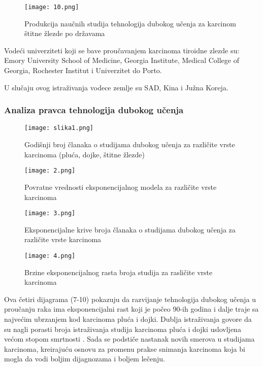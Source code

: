 \documentclass[a4paper]{article}
\begin{document}
\begin{figure}[hbt!]
\centering
\texttt{[image: 10.png]}
\caption{Produkcija naučnih studija tehnologija dubokog učenja za karcinom štitne žlezde po državama}
\end{figure}

Vodeći univerziteti koji se bave proučavanjem karcinoma tiroidne zlezde su: Emory University School of Medicine, Georgia Institute, Medical College of Georgia, Rochester Institut i Univerzitet do Porto.

U slučaju ovog istraživanja vodece zemlje su SAD, Kina i Južna Koreja.


\FloatBarrier

\subsubsection{Analiza pravca tehnologija dubokog učenja}
\label{subsec:ppnaslov1}

\begin{figure}[hbt!]
\centering
\texttt{[image: slika1.png]}
\caption{Godišnji broj članaka o studijama dubokog učenja za različite vrste karcinoma (pluća, dojke, štitne žlezde)}
\end{figure}

\begin{figure}[hbt!]
\centering
\texttt{[image: 2.png]}
\caption{Povratne vrednosti eksponencijalnog modela za različite vrste karcinoma}
\end{figure}



\begin{figure}[hbt!]
\centering
\texttt{[image: 3.png]}
\caption{Eksponencijalne krive broja članaka o studijama dubokog učenja za različite vrste karcinoma}
\end{figure}

\begin{figure}[hbt!]
\centering
\texttt{[image: 4.png]}
\caption{Brzine eksponencijalnog rasta broja studija za rasličite vrste karcinoma}
\end{figure}

\newline
Ova četiri dijagrama (7-10) pokazuju da razvijanje tehnologija dubokog učenja u proučanju raka ima eksponencijalni rast koji je počeo 90-ih godina i dalje traje sa najvećim ubrzanjem kod karcinoma pluća i dojki. Dublja istraživanja govore da su nagli porasti broja istraživanja studija karcinoma pluća i dojki uslovljena većom stopom smrtnosti \cite{coccia2}. Sada se podstiče nastanak novih smerova u studijama karcinoma, kreirajuću osnovu za promenu prakse snimanja karcinoma koja bi mogla da vodi boljim dijagnozama i boljem lečenju.
\end{document}
